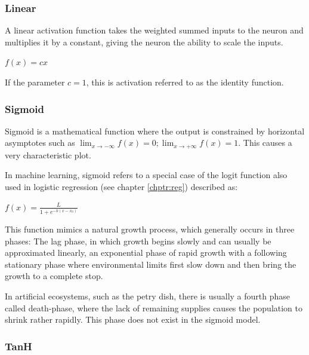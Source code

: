 \subsubsection{Linear}

A linear activation function takes the weighted summed inputs to the neuron and multiplies it by a constant, giving the neuron the ability to scale the inputs.

{\centering
  $f(x)=cx$\par
}

If the parameter $c = 1$, this is activation referred to as the identity function.


\subsubsection{Sigmoid}

Sigmoid is a mathematical function where the output is constrained by horizontal asymptotes such as $\displaystyle \lim_{x\to - \infty} f(x) =  0; \lim_{x\to + \infty} f(x) =  1$. This causes a very characteristic plot. 

In machine learning, sigmoid refers to a special case of the logit function also used in logistic regression (see chapter \ref{chptr:reg}) described as:

{\centering
	$\displaystyle f(x)={\frac {L}{1+e^{-k(x-x_{0})}}}$\par
}

This function mimics a natural growth process, which generally occurs in three phases: The lag phase, in which growth begins slowly and can usually be approximated linearly, an exponential phase of rapid growth with a following stationary phase where environmental limits first slow  down and then bring the growth to a complete stop.

In artificial ecosystems, such as the petry dish, there is usually a fourth phase called death-phase, where the lack of remaining supplies causes the population to shrink rather rapidly. This phase does not exist in the sigmoid model. 




\subsubsection{TanH}

